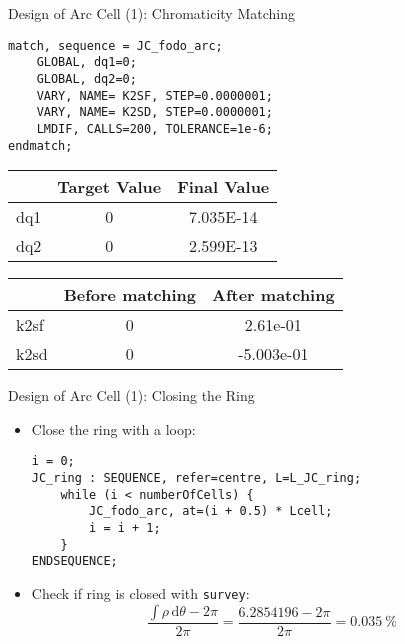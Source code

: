\documentclass{beamer}
\begin{document}
\begin{frame}[t,fragile]{Design of Arc Cell (1): Chromaticity Matching}
\begin{lstlisting}
match, sequence = JC_fodo_arc;
    GLOBAL, dq1=0;
    GLOBAL, dq2=0;
    VARY, NAME= K2SF, STEP=0.0000001;
    VARY, NAME= K2SD, STEP=0.0000001;
    LMDIF, CALLS=200, TOLERANCE=1e-6;
endmatch;
\end{lstlisting}

\begin{table}
\begin{tabularx}{0.6\textwidth}{lS[table-format=-1.2e-1]S[table-format=-1.2e-1]}
	\toprule
	    & {Target Value} & {Final Value}  \\ \midrule
	dq1 & 0              & 7.035E-14 \\
	dq2 & 0              & 2.599E-13 \\ \bottomrule
\end{tabularx}
\end{table}

\begin{table}
\begin{tabularx}{0.6\textwidth}{lSS[table-format=-1.4e-1]}
	\toprule
	     & {Before matching} & {After matching} \\ \midrule
	k2sf & 0                 & 2.61e-01      \\
	k2sd & 0                 & -5.003e-01     \\ \bottomrule
\end{tabularx}
\end{table}
\end{frame}

\begin{frame}[t,fragile]{Design of Arc Cell (1): Closing the Ring}
\begin{itemize}
\item Close the ring with a loop:
\begin{lstlisting}
i = 0;
JC_ring : SEQUENCE, refer=centre, L=L_JC_ring; 
    while (i < numberOfCells) {
        JC_fodo_arc, at=(i + 0.5) * Lcell;
        i = i + 1;
    }
ENDSEQUENCE;
\end{lstlisting}
\item Check if ring is closed with \texttt{survey}:
\begin{equation*}
\frac{\int\rho\,\text{d}\theta-2\pi}{2\pi}=\frac{\num{6.2854196}-2\pi}{2\pi}=\SI{0.035}{\percent}
\end{equation*}
\end{itemize}
\end{frame}
\end{document}
